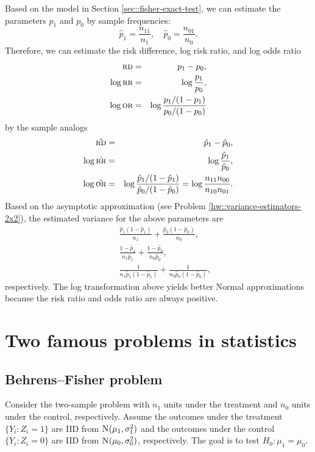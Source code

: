 Based on the model in Section \ref{sec::fisher-exact-test}, we can estimate the parameters $p_1$ and $p_0$ by sample frequencies:
$$
\hat p_1 = \frac{n_{11}}{n_1} ,\quad \hat p_0 = \frac{n_{01}}{n_0}.
$$
Therefore, we can estimate the risk difference, log risk ratio, and log odds ratio 
\begin{eqnarray*}
\textsc{rd} &=& p_1 - p_0,\\ 
\log \textsc{rr} &=&\log \frac{ p_1}{p_0},\\ 
\log \textsc{or} &=& \log \frac{ p_1/(1-p_1)}{p_0/(1-p_0)}
\end{eqnarray*}
by the sample analogs
\begin{eqnarray*}
\hat {\textsc{rd}} &=& \hat  p_1 -\hat  p_0,\\ 
\log \hat {\textsc{rr}} &=& \log\frac{ \hat p_1}{\hat p_0},\\ 
\log \hat {\textsc{or}} &=&\log \frac{ \hat p_1/(1-\hat p_1)}{\hat p_0/(1-\hat p_0)}  = \log\frac{n_{11}n_{00}}{n_{10}n_{01}}.
\end{eqnarray*}
Based on the asymptotic approximation (see Problem \ref{hw::variance-estimators-2x2}), the estimated variance for the above parameters are 
\begin{eqnarray*}
&&\frac{ \hat  p_1 (1-\hat  p_1) }{n_1} + \frac{ \hat  p_0 (1-\hat  p_0) }{n_0},\\
&& \frac{   1-\hat  p_1 }{n_1 \hat  p_1} + \frac{   1-\hat  p_0 }{n_0 \hat  p_0 },\\
&& \frac{ 1 }{n_1  \hat  p_1 (1-\hat  p_1)} + \frac{ 1 }{n_0 \hat  p_0 (1-\hat  p_0)},
\end{eqnarray*}
respectively.
The log transformation above yields better Normal approximations because the risk ratio and odds ratio are always positive. 




\section{Two famous problems in statistics}



\subsection{Behrens--Fisher problem}\label{sec::bf-problem}



Consider the two-sample problem with $n_1$ units under the treatment and $n_0$ units under the control, respectively. Assume the outcomes under the treatment $\{  Y_i: Z_i = 1 \}$ are IID from $\textsc{N} (\mu_1, \sigma_1^2)$ and the outcomes under the control  $\{  Y_i: Z_i = 0 \}$ are IID from $\textsc{N} (\mu_0, \sigma_0^2)$, respectively. The goal is to test $H_0: \mu_1 = \mu_0$. 




